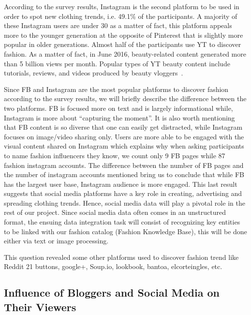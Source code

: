 According to the survey results, Instagram is the second platform to be used in order to spot new clothing trends, i.e. 49.1\% of the participants. A majority of these Instagram users are under 30 as a matter of fact, this platform appeals more to the younger generation at the opposite of Pinterest that is slightly more popular in older generations. Almost half of the participants use \ac{YT} to discover fashion. As a matter of fact, in June 2016, beauty-related content generated more than 5 billion views per month. Popular types of \ac{YT} beauty content include tutorials, reviews, and videos produced by beauty vloggers~\cite{stat}.

Since \ac{FB} and Instagram are the most popular platforms to discover fashion according to the survey results, we will briefly describe the difference between the two platforms. \ac{FB} is focused more on text and is largely informational while, Instagram is more about “capturing the moment”. It is also worth mentioning that \ac{FB} content is so diverse that one can easily get distracted, while Instagram focuses on image/video sharing only. Users are more able to be engaged with the visual content shared on Instagram which explains why when asking participants to name fashion influencers they know, we count only 9 \ac{FB} pages while  87 fashion instagram accounts. The difference between the number of \ac{FB} pages and the number of instagram accounts mentioned bring us to conclude that while \ac{FB} has the largest user base, Instagram audience is more engaged. This last result suggests that social media platforms have a key role in creating, advertising and spreading clothing trends. Hence, social media data will play a pivotal role in the rest of our project. Since social media data often comes in an unstructured format, the ensuing data integration task will consist of recognizing key entities to be linked with our fashion catalog (Fashion Knowledge Base), this will be done either via text or image processing.

This question revealed some other platforms used to discover fashion trend like Reddit 21 buttons, google+, Soup.io, lookbook, bantoa, elcorteingles, etc.

\subsection{Influence of Bloggers and Social Media on Their Viewers}

